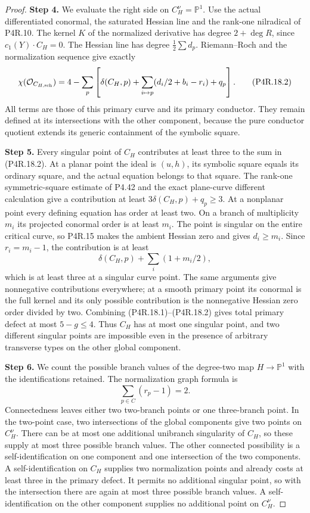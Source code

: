 \begin{proof}
\noindent\textbf{Step 4.} We evaluate the right side on $C_H^\nu=\mathbb P^1$.
Use the actual differentiated conormal, the saturated Hessian
line and the rank-one nilradical of P4R.10. The kernel $K$
of the normalized derivative has degree $2+\deg R$, since
$c_1(Y)\cdot C_H=0$. The Hessian line has degree
$\tfrac12\sum d_p$. Riemann--Roch and the normalization
sequence give exactly
\[
 \chi(\mathcal O_{C_{H,\rm sch}})
 =4-\sum_p\left[\delta(C_H,p)
      +\sum_{i\mapsto p}(d_i/2+b_i-r_i)+q_p\right].
                                                            \tag{P4R.18.2}
\]
All terms are those of this primary curve and its primary
conductor. They remain defined at its intersections with
the other component, because the pure conductor quotient
extends its generic containment of the symbolic square.

\noindent\textbf{Step 5.} Every singular point of $C_H$ contributes at least three
to the sum in (P4R.18.2). At a planar point the ideal is
$(u,h)$, its symbolic square equals its ordinary square,
and the actual equation belongs to that square. The
rank-one symmetric-square estimate of P4.42 and the exact
plane-curve different calculation give a contribution at
least $3\delta(C_H,p)+q_p\ge3$.
At a nonplanar point every defining equation has order at
least two. On a branch of multiplicity $m_i$ its projected
conormal order is at least $m_i$. The point is singular
on the entire critical curve, so P4R.15 makes the ambient
Hessian zero and gives $d_i\ge m_i$. Since $r_i=m_i-1$,
the contribution is at least
\[
                      \delta(C_H,p)+\sum_i(1+m_i/2),
\]
which is at least three at a singular curve point. The
same arguments give nonnegative contributions everywhere;
at a smooth primary point its conormal is the full kernel
and its only possible contribution is the nonnegative
Hessian zero order divided by two.
Combining (P4R.18.1)--(P4R.18.2) gives total primary
defect at most $5-g\le4$. Thus $C_H$ has at most one
singular point, and two different singular points are
impossible even in the presence of arbitrary transverse
types on the other global component.

\noindent\textbf{Step 6.} We count the possible branch values of the degree-two map
$H\to\mathbb P^1$ with the identifications retained.
The normalization graph formula is
\[
                         \sum_{p\in C}(r_p-1)=2.
\]
Connectedness leaves either two two-branch points or one
three-branch point. In the two-point case, two intersections
of the global components give two points on $C_H^\nu$.
There can be at most one additional unibranch singularity
of $C_H$, so these supply at most three possible branch
values. The other connected possibility is a self-identification
on one component and one intersection of the two components.
A self-identification on $C_H$ supplies two normalization
points and already costs at least three in the primary
defect. It permits no additional singular point, so with
the intersection there are again at most three possible
branch values. A self-identification on the other component
supplies no additional point on $C_H^\nu$.


\end{proof}

